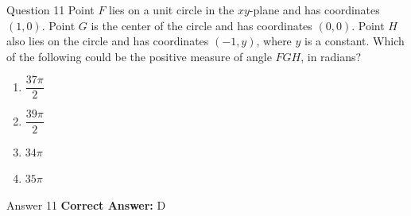 \documentclass{beamer}
\begin{document}
\begin{frame}{Question 11}
\small
Point \(F\) lies on a unit circle in the \(xy\)-plane and has coordinates \((1, 0)\). Point \(G\) is the center of the circle and has coordinates \((0, 0)\). Point \(H\) also lies on the circle and has coordinates \((-1, y)\), where \(y\) is a constant. Which of the following could be the positive measure of angle \(FGH\), in radians?
\vspace{0.35cm}
\begin{enumerate}
    \item[A.] \(\dfrac{37\pi}{2}\)
    \item[B.] \(\dfrac{39\pi}{2}\)
    \item[C.] \(34\pi\)
    \item[D.] \(35\pi\)
\end{enumerate}
\end{frame}
\begin{frame}{Answer 11}
\small
\textbf{Correct Answer:} D
\end{frame}

\newcommand{\AdviceTip}[3]{%
\noindent\begin{minipage}{\linewidth}
\begin{tikzpicture}
\node[
  rounded corners=8pt,
  fill=white,
  draw=novelPurple!22,
  line width=0.6pt,
  inner xsep=10pt,
  inner ysep=7pt,
  text width=\dimexpr\linewidth-22pt\relax,
  align=flush left
] (card) {%
  {\color{novelPurple}\bfseries\small #1~~#2}\\[0.15em]
  {\scriptsize\textcolor{lightText}{#3}}%
};
\fill[novelPurple] (card.south west) rectangle ([xshift=3pt]card.north west);
\end{tikzpicture}%
\end{minipage}\vspace{0.22em}%
}
\end{document}
